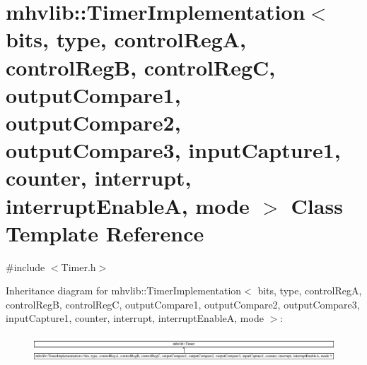\hypertarget{classmhvlib_1_1_timer_implementation}{\section{mhvlib\-:\-:Timer\-Implementation$<$ bits, type, control\-Reg\-A, control\-Reg\-B, control\-Reg\-C, output\-Compare1, output\-Compare2, output\-Compare3, input\-Capture1, counter, interrupt, interrupt\-Enable\-A, mode $>$ Class Template Reference}
\label{classmhvlib_1_1_timer_implementation}
}


{\ttfamily \#include $<$Timer.\-h$>$}

Inheritance diagram for mhvlib\-:\-:Timer\-Implementation$<$ bits, type, control\-Reg\-A, control\-Reg\-B, control\-Reg\-C, output\-Compare1, output\-Compare2, output\-Compare3, input\-Capture1, counter, interrupt, interrupt\-Enable\-A, mode $>$\-:\begin{figure}[H]
\begin{center}
\leavevmode
\includegraphics[height=0.992028cm]{classmhvlib_1_1_timer_implementation}
\end{center}
\end{figure}

